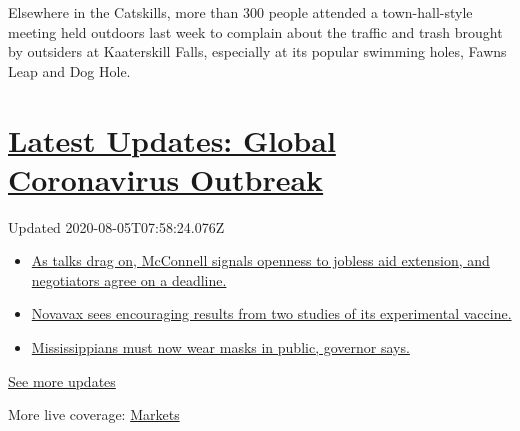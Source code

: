 Elsewhere in the Catskills, more than 300 people attended a
town-hall-style meeting held outdoors last week to complain about the
traffic and trash brought by outsiders at Kaaterskill Falls, especially
at its popular swimming holes, Fawns Leap and Dog Hole.

\hypertarget{latest-updates-global-coronavirus-outbreak}{%
\section{\texorpdfstring{\href{https://www.nytimes3xbfgragh.onion/2020/08/04/world/coronavirus-cases.html?action=click\&pgtype=Article\&state=default\&region=MAIN_CONTENT_1\&context=storylines_live_updates}{Latest
Updates: Global Coronavirus
Outbreak}}{Latest Updates: Global Coronavirus Outbreak}}\label{latest-updates-global-coronavirus-outbreak}}

Updated 2020-08-05T07:58:24.076Z

\begin{itemize}
\tightlist
\item
  \href{https://www.nytimes3xbfgragh.onion/2020/08/04/world/coronavirus-cases.html?action=click\&pgtype=Article\&state=default\&region=MAIN_CONTENT_1\&context=storylines_live_updates\#link-762df92}{As
  talks drag on, McConnell signals openness to jobless aid extension,
  and negotiators agree on a deadline.}
\item
  \href{https://www.nytimes3xbfgragh.onion/2020/08/04/world/coronavirus-cases.html?action=click\&pgtype=Article\&state=default\&region=MAIN_CONTENT_1\&context=storylines_live_updates\#link-1228a480}{Novavax
  sees encouraging results from two studies of its experimental
  vaccine.}
\item
  \href{https://www.nytimes3xbfgragh.onion/2020/08/04/world/coronavirus-cases.html?action=click\&pgtype=Article\&state=default\&region=MAIN_CONTENT_1\&context=storylines_live_updates\#link-794484ed}{Mississippians
  must now wear masks in public, governor says.}
\end{itemize}

\href{https://www.nytimes3xbfgragh.onion/2020/08/04/world/coronavirus-cases.html?action=click\&pgtype=Article\&state=default\&region=MAIN_CONTENT_1\&context=storylines_live_updates}{See
more updates}

More live coverage:
\href{https://www.nytimes3xbfgragh.onion/live/2020/08/04/business/stock-market-today-coronavirus?action=click\&pgtype=Article\&state=default\&region=MAIN_CONTENT_1\&context=storylines_live_updates}{Markets}

